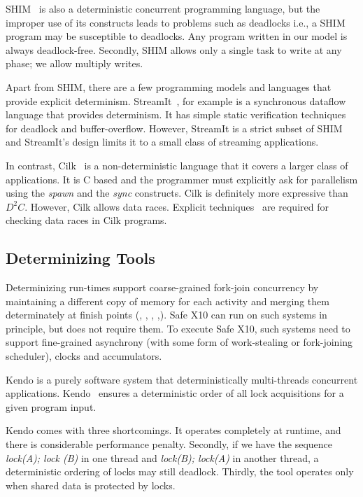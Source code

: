  
SHIM~\cite{edwards2005shim2,tardieu2006scheduling-independent} is also
a deterministic concurrent programming language, but the improper use
of its constructs leads to problems such as deadlocks i.e., a SHIM program
may be susceptible to deadlocks. Any program written in our model is always
deadlock-free. Secondly, SHIM allows only a single task to write at any phase;
we allow multiply writes.

 
Apart from SHIM, there are  a few programming models and languages 
that provide explicit determinism. StreamIt~\cite{thies2001streamit}, for 
example is a synchronous dataflow language that provides determinism. It 
has simple static verification techniques for deadlock and buffer-overflow. 
However, StreamIt is a strict subset of SHIM and StreamIt's design 
limits it to a small class of streaming applications. 
 


In contrast, 
Cilk~\cite{blumofe1995cilk} is a non-deterministic language that it covers a larger
class of applications. It is C based
and the programmer must explicitly ask for parallelism using 
the \emph{spawn} and the \emph{sync} constructs. 
Cilk is definitely more
expressive than $D^2C$.
However, Cilk allows data races. 
Explicit techniques~\cite{cheng1998detecting} are
required for checking data races in Cilk programs.  




\subsection{Determinizing Tools} 
Determinizing run-times support coarse-grained fork-join concurrency
by maintaining a different copy of memory for each activity and
merging them determinately at finish points (\cite{grace},
\cite{core-det}, \cite{dmp}, \cite{kendo},\cite{determinator}). Safe
X10 can run on such systems in principle, but does not require them.
To execute Safe X10, such systems need to support fine-grained
asynchrony (with some form of work-stealing or fork-joining
scheduler), clocks and accumulators.

Kendo is a purely software system that deterministically multi-threads
concurrent applications.  Kendo~\cite{olszewski2009kendo} ensures a
deterministic order of all lock acquisitions for a given program
input.

Kendo comes with three shortcomings. It operates completely at runtime,
and there is considerable performance penalty. Secondly, if
we have the sequence \emph{lock(A); lock (B)} in one thread and
\emph{lock(B); lock(A)} in another thread, a deterministic ordering of
locks may still deadlock. Thirdly, the tool operates only when
shared data is protected by locks.

